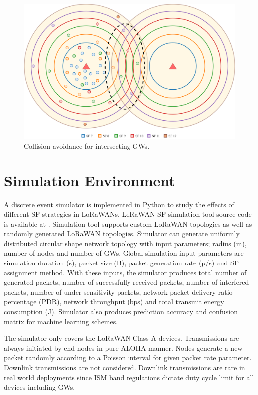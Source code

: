 \documentclass[conference]{IEEEtran}
\begin{document}
\begin{figure}
\centering
\includegraphics[width=\linewidth]{collision_solution_multi_gw}
\caption{Collision avoidance for intersecting GWs.}
\label{fig:collision_solution_multi_gw}
\end{figure}


\section{Simulation Environment} \label{Simulation Environment}
\par A discrete event simulator is implemented in Python to study the effects of different SF strategies in LoRaWANs. LoRaWAN SF simulation tool source code is available at \cite{simlorasf}. Simulation tool supports custom LoRaWAN topologies as well as randomly generated LoRaWAN topologies. Simulator can generate uniformly distributed circular shape network topology with input parameters; radius (m), number of nodes and number of GWs. Global simulation input parameters are simulation duration (s), packet size (B), packet generation rate (p/s) and SF assignment method. With these inputs, the simulator produces total number of generated packets, number of successfully received packets, number of interfered packets, number of under sensitivity packets, network packet delivery ratio percentage (PDR), network throughput (bps) and total transmit energy consumption (J). Simulator also produces prediction accuracy and confusion matrix for machine learning schemes.

\par The simulator only covers the LoRaWAN Class A devices. Transmissions are always initiated by end nodes in pure ALOHA manner. Nodes generate a new packet randomly according to a Poisson interval for given packet rate parameter. Downlink transmissions are not considered. Downlink transmissions are rare in real world deployments since ISM band regulations dictate duty cycle limit for all devices including GWs.
\end{document}
